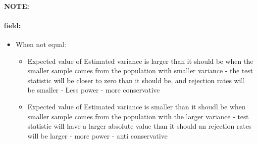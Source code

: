 \documentclass[12pt]{article}
\newenvironment{note}{\paragraph{NOTE:}}{}
\newenvironment{field}{\paragraph{field:}}{}
\begin{document}
\begin{note}
\begin{field}
\begin{itemize}
   \item When not equal:
         \begin{itemize}
          \item Expected value of Estimated variance is larger than it should be when the smaller sample comes from the population with smaller variance - the test statistic will be closer to zero than it should be, and rejection rates will be smaller - Less power - more conservative
          \item Expected value of Estimated variance is smaller than it shoudl be when smaller sample comes from the population with the larger variance - test statistic will have a larger absolute value than it should an rejection rates will be larger  - more power - anti conservative
         \end{itemize}
  \end{itemize}
 \end{field}
\end{note}
\end{document}
